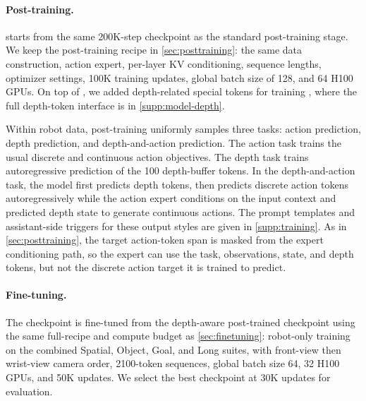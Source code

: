 \paragraph{Post-training.}
\molmothink starts from the same 200K-step \molmoacttpre checkpoint as the
standard \molmoactt post-training stage. We keep the post-training recipe in
\autoref{sec:posttraining}: the same data construction, action expert, per-layer
KV conditioning, sequence lengths, optimizer settings, 100K training
updates, global batch size of 128, and 64 H100 GPUs. On top of \molmoactt, we added depth-related special tokens for training \molmothink, where the full depth-token interface is in \autoref{supp:model-depth}.

Within robot data, post-training uniformly samples three tasks: action
prediction, depth prediction, and depth-and-action prediction. The action task
trains the usual discrete and continuous action objectives. The depth task
trains autoregressive prediction of the 100 depth-buffer tokens. In the
depth-and-action task, the model first predicts depth tokens, then predicts
discrete action tokens autoregressively while the action expert conditions on
the input context and predicted depth state to generate continuous actions. The
prompt templates and assistant-side triggers for these output styles are given
in \autoref{supp:training}. As in \autoref{sec:posttraining}, the target
action-token span is masked from the expert conditioning path, so the expert
can use the task, observations, state, and depth tokens, but not the discrete
action target it is trained to predict.



\paragraph{Fine-tuning.}
The \molmothinklibero checkpoint is fine-tuned from the depth-aware
post-trained checkpoint using the same full-\libero recipe and compute budget as
\autoref{sec:finetuning}: robot-only training on the combined Spatial, Object,
Goal, and Long suites, with front-view then wrist-view camera order,
2100-token sequences, global batch size 64, 32 H100 GPUs, and 50K updates. We select the
best checkpoint at 30K updates for evaluation.

